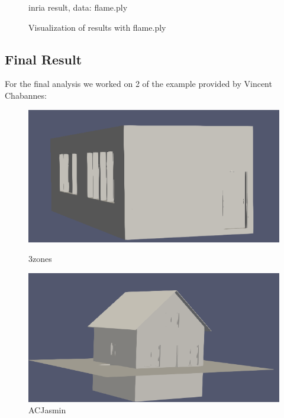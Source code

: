 \documentclass{article}
\begin{document}
\begin{figure}[H]
\begin{minipage}[t]{0.27\textwidth}
        \caption*{inria result,\newline
        data: flame.ply}
      \end{minipage}
      \caption{Visualization of results with flame.ply}
\end{figure}

\subsection{Final Result}

For the final analysis we worked on 2 of the example provided by Vincent Chabannes:
\vspace{0.5cm}
\begin{figure}[H]
  \centering
  \begin{minipage}[t]{0.29\textwidth}
    \includegraphics[width=\textwidth]{../../images/screen_kinetic/3zones.png}
    \caption*{3zones}
  \end{minipage}
  \hspace{0.05\textwidth}
  \begin{minipage}[t]{0.27\textwidth}
    \includegraphics[width=\textwidth]{../../images/screen_kinetic/ACJasmin.png}
    \caption*{ACJasmin}
  \end{minipage}

\end{figure}
\end{document}
